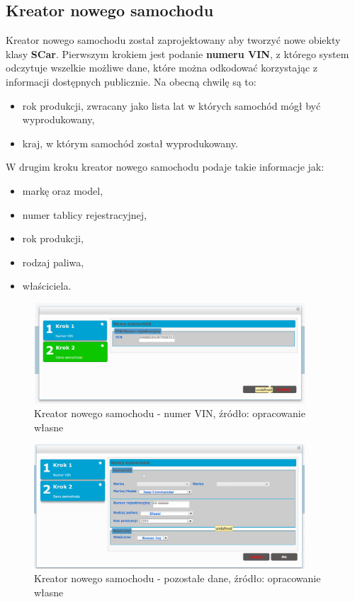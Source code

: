 \subsection{Kreator nowego samochodu}
	Kreator nowego samochodu został zaprojektowany aby tworzyć nowe obiekty klasy \textbf{SCar}.	Pierwszym krokiem jest podanie \textbf{numeru VIN}, z którego system odczytuje wszelkie możliwe dane, które można odkodować korzystając z informacji dostępnych publicznie. Na obecną chwilę są to:
	\begin{itemize}
		\item rok produkcji, zwracany jako lista lat w których samochód mógł być wyprodukowany,
		\item kraj, w którym samochód został wyprodukowany.
	\end{itemize}
	
	W drugim kroku kreator nowego samochodu podaje takie informacje jak:
	\begin{itemize}
		\item markę oraz model,
		\item numer tablicy rejestracyjnej,
		\item rok produkcji,
		\item rodzaj paliwa,
		\item właściciela.
	\end{itemize}
	\begin{figure}[th]
		\centering
		\includegraphics[width=0.9\textwidth]{images/newCar-vin}
		\caption[Kreator nowego samochodu - numer VIN]{
			Kreator nowego samochodu - numer VIN, źródło: opracowanie własne
		}
		\label{app:newCar_vin}
	\end{figure}	
	\begin{figure}[th]
		\centering
		\includegraphics[width=0.9\textwidth]{images/newCar-data}
		\caption[Kreator nowego samochodu - pozostałe dane]{
			Kreator nowego samochodu - pozostałe dane, źródło: opracowanie własne
		}
		\label{app:newCar_data}
	\end{figure}


